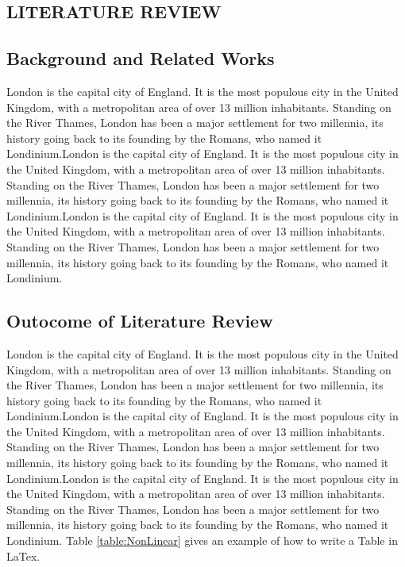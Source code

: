 \begin{center}
	\chapter{LITERATURE REVIEW}
\end{center}
\section{Background and Related Works} 
London is the capital city of England\cite{baldini-soares-etal-2019-matching}. It is the most populous city in the United Kingdom, with a metropolitan area of over 13 million inhabitants. Standing on the River Thames, London has been a major settlement for two millennia, its history going back to its founding by the Romans, who named it Londinium.London is the capital city of England. It is the most populous city in the United Kingdom, with a metropolitan area of over 13 million inhabitants. Standing on the River Thames, London has been a major settlement for two millennia, its history going back to its founding by the Romans, who named it Londinium.London is the capital city of England. It is the most populous city in the United Kingdom, with a metropolitan area of over 13 million inhabitants. Standing on the River Thames, London has been a major settlement for two millennia, its history going back to its founding by the Romans, who named it Londinium\cite{article2}.

\section{Outocome of Literature Review} 
London is the capital city of England. It is the most populous city in the United Kingdom, with a metropolitan area of over 13 million inhabitants. Standing on the River Thames, London has been a major settlement for two millennia, its history going back to its founding by the Romans, who named it Londinium.London is the capital city of England. It is the most populous city in the United Kingdom, with a metropolitan area of over 13 million inhabitants. Standing on the River Thames, London has been a major settlement for two millennia, its history going back to its founding by the Romans, who named it Londinium.London is the capital city of England. It is the most populous city in the United Kingdom, with a metropolitan area of over 13 million inhabitants. Standing on the River Thames, London has been a major settlement for two millennia, its history going back to its founding by the Romans, who named it Londinium. Table \ref{table:NonLinear} gives an example of how to write a Table in LaTex.

